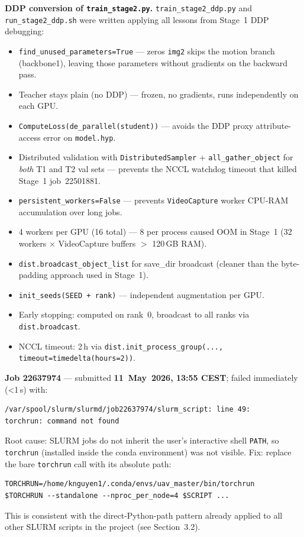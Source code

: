 \textbf{DDP conversion of \texttt{train\_stage2.py}.}
\texttt{train\_stage2\_ddp.py} and \texttt{run\_stage2\_ddp.sh}
were written applying all lessons from Stage~1 DDP debugging:
\begin{itemize}
    \item \texttt{find\_unused\_parameters=True} — zeros \texttt{img2}
          skips the motion branch (backbone1), leaving those parameters
          without gradients on the backward pass.
    \item Teacher stays plain (no DDP) — frozen, no gradients,
          runs independently on each GPU.
    \item \texttt{ComputeLoss(de\_parallel(student))} — avoids the
          DDP proxy attribute-access error on \texttt{model.hyp}.
    \item Distributed validation with \texttt{DistributedSampler}
          + \texttt{all\_gather\_object} for \emph{both} T1 and T2
          val sets — prevents the NCCL watchdog timeout that killed
          Stage~1 job~22501881.
    \item \texttt{persistent\_workers=False} — prevents
          \texttt{VideoCapture} worker CPU-RAM accumulation over long jobs.
    \item 4 workers per GPU (16 total) — 8 per process caused OOM
          in Stage~1 (32 workers $\times$ VideoCapture buffers
          $>$ 120\,GB RAM).
    \item \texttt{dist.broadcast\_object\_list} for save\_dir broadcast
          (cleaner than the byte-padding approach used in Stage~1).
    \item \texttt{init\_seeds(SEED + rank)} — independent augmentation
          per GPU.
    \item Early stopping: computed on rank~0,
          broadcast to all ranks via \texttt{dist.broadcast}.
    \item NCCL timeout: 2\,h via
          \texttt{dist.init\_process\_group(..., timeout=timedelta(hours=2))}.
\end{itemize}

\textbf{Job 22637974} — submitted \textbf{11~May~2026, 13:55 CEST};
failed immediately (\textless{}1\,s) with:
\begin{verbatim}
/var/spool/slurm/slurmd/job22637974/slurm_script: line 49:
torchrun: command not found
\end{verbatim}
Root cause: SLURM jobs do not inherit the user's interactive shell
\texttt{PATH}, so \texttt{torchrun} (installed inside the conda
environment) was not visible. Fix: replace the bare \texttt{torchrun}
call with its absolute path:
\begin{verbatim}
TORCHRUN=/home/knguyen1/.conda/envs/uav_master/bin/torchrun
$TORCHRUN --standalone --nproc_per_node=4 $SCRIPT ...
\end{verbatim}
This is consistent with the direct-Python-path pattern already applied
to all other SLURM scripts in the project (see Section~3.2).

